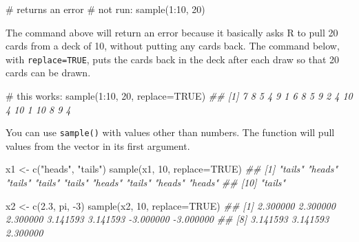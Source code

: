 \documentclass[
  13,
  letterpaper,
]{report}
\newenvironment{Shaded}{\begin{snugshade}}{\end{snugshade}}
\newcommand{\AttributeTok}[1]{\textcolor[rgb]{0.40,0.45,0.13}{#1}}
\newcommand{\CommentTok}[1]{\textcolor[rgb]{0.37,0.37,0.37}{#1}}
\newcommand{\ConstantTok}[1]{\textcolor[rgb]{0.56,0.35,0.01}{#1}}
\newcommand{\DecValTok}[1]{\textcolor[rgb]{0.68,0.00,0.00}{#1}}
\newcommand{\DocumentationTok}[1]{\textcolor[rgb]{0.37,0.37,0.37}{\textit{#1}}}
\newcommand{\FloatTok}[1]{\textcolor[rgb]{0.68,0.00,0.00}{#1}}
\newcommand{\FunctionTok}[1]{\textcolor[rgb]{0.28,0.35,0.67}{#1}}
\newcommand{\NormalTok}[1]{\textcolor[rgb]{0.00,0.23,0.31}{#1}}
\newcommand{\OtherTok}[1]{\textcolor[rgb]{0.00,0.23,0.31}{#1}}
\newcommand{\SpecialCharTok}[1]{\textcolor[rgb]{0.37,0.37,0.37}{#1}}
\newcommand{\StringTok}[1]{\textcolor[rgb]{0.13,0.47,0.30}{#1}}
\begin{document}
\begin{Shaded}
\begin{Highlighting}[]
\CommentTok{\# returns an error}
\CommentTok{\# not run:}
\FunctionTok{sample}\NormalTok{(}\DecValTok{1}\SpecialCharTok{:}\DecValTok{10}\NormalTok{, }\DecValTok{20}\NormalTok{)}
\end{Highlighting}
\end{Shaded}

The command above will return an error because it basically asks R to
pull 20 cards from a deck of 10, without putting any cards back. The
command below, with \texttt{replace=TRUE}, puts the cards back in the
deck after each draw so that 20 cards can be drawn.

\begin{Shaded}
\begin{Highlighting}[]
\CommentTok{\# this works:}
\FunctionTok{sample}\NormalTok{(}\DecValTok{1}\SpecialCharTok{:}\DecValTok{10}\NormalTok{, }\DecValTok{20}\NormalTok{, }\AttributeTok{replace=}\ConstantTok{TRUE}\NormalTok{)}
\DocumentationTok{\#\#  [1]  7  8  5  4  9  1  6  8  5  9  2  4 10  4 10  1 10  8  9  4}
\end{Highlighting}
\end{Shaded}

You can use \texttt{sample()} with values other than numbers. The
function will pull values from the vector in its first argument.

\begin{Shaded}
\begin{Highlighting}[]

\NormalTok{x1 }\OtherTok{\textless{}{-}} \FunctionTok{c}\NormalTok{(}\StringTok{"heads"}\NormalTok{, }\StringTok{"tails"}\NormalTok{)}
\FunctionTok{sample}\NormalTok{(x1, }\DecValTok{10}\NormalTok{, }\AttributeTok{replace=}\ConstantTok{TRUE}\NormalTok{)}
\DocumentationTok{\#\#  [1] "tails" "heads" "tails" "tails" "tails" "heads" "tails" "heads" "heads"}
\DocumentationTok{\#\# [10] "tails"}

\NormalTok{x2 }\OtherTok{\textless{}{-}} \FunctionTok{c}\NormalTok{(}\FloatTok{2.3}\NormalTok{, pi, }\SpecialCharTok{{-}}\DecValTok{3}\NormalTok{)}
\FunctionTok{sample}\NormalTok{(x2, }\DecValTok{10}\NormalTok{, }\AttributeTok{replace=}\ConstantTok{TRUE}\NormalTok{)}
\DocumentationTok{\#\#  [1]  2.300000  2.300000  2.300000  3.141593  3.141593 {-}3.000000 {-}3.000000}
\DocumentationTok{\#\#  [8]  3.141593  3.141593  2.300000}
\end{Highlighting}
\end{Shaded}
\end{document}
